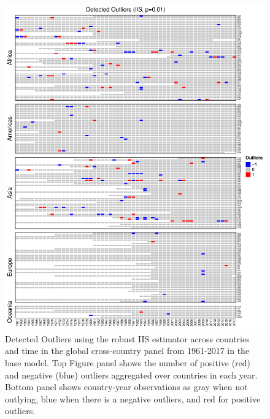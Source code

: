 \documentclass[11pt, letterpaper]{article}
\numberwithin{algorithm}{section}
\numberwithin{assumption}{section}
\numberwithin{lemma}{section}
\numberwithin{theorem}{section}
\numberwithin{corollary}{section}
\numberwithin{remark}{section}
\numberwithin{equation}{section}
\numberwithin{figure}{section}
\numberwithin{table}{section}
\begin{document}
\begin{figure}[!htbp]  \vspace{-.35in}
\centering
\includegraphics[width = \textwidth]{heat1.pdf}
\caption{Detected Outliers using the robust IIS estimator across countries and time in the global cross-country panel from 1961-2017 in the base model. Top Figure panel shows the number of positive (red) and negative (blue) outliers aggregated over countries in each year. Bottom panel shows country-year observations as gray when not outlying, blue when there is a negative outliers, and red for positive outliers.}
\label{fig_out_app1}
\end{figure}
\end{document}

